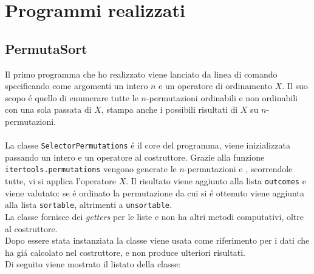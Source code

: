 \chapter{Programmi realizzati}
\section*{PermutaSort}
Il primo programma che ho realizzato viene lanciato da linea di comando specificando come argomenti un intero $n$ e un operatore di ordinamento $X$. Il suo scopo \'e quello di enumerare tutte le $n$-permutazioni ordinabili e non ordinabili con una sola passata di $X$, stampa anche i possibili risultati di $X$ su $n$-permutazioni.\\\\
La classe \texttt{SelectorPermutations} \'e il core del programma, viene inizializzata passando un intero e un operatore al costruttore. Grazie alla funzione \texttt{itertools.permutations} vengono generate le $n$-permutazioni e , scorrendole tutte, vi si applica l'operatore $X$. Il risultato viene aggiunto alla lista \texttt{outcomes} e viene valutato: se \'e ordinato la permutazione da cui si \'e ottenuto viene aggiunta alla lista \texttt{sortable}, altrimenti a \texttt{unsortable}.\\La classe fornisce dei \textit{getters} per le liste e non ha altri metodi computativi, oltre al costruttore.\\
Dopo essere stata instanziata la classe viene usata come riferimento per i dati che ha gi\'a calcolato nel costruttore, e non produce ulteriori risultati.\\Di seguito viene mostrato il listato della classe:
\\
\pagebreak
